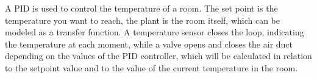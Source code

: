 \begin{ejemplo}
A PID is used to control the temperature of a room. The set point is the temperature you want to reach, the plant is the room itself, which can be modeled as a transfer function. A temperature sensor closes the loop, indicating the temperature at each moment, while a valve opens and closes the air duct depending on the values of the PID controller, which will be calculated in relation to the setpoint value and to the value of the current temperature in the room.
\end{ejemplo} 










